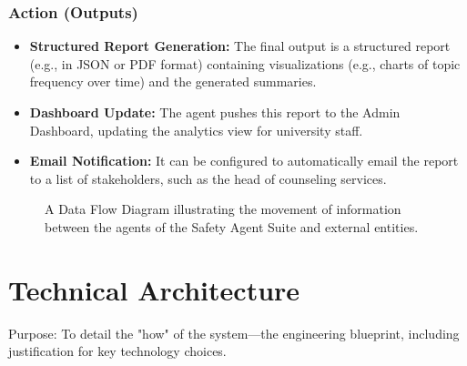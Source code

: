 \subsubsection{Action (Outputs)}
\begin{itemize}
    \item \textbf{Structured Report Generation:} The final output is a structured report (e.g., in JSON or PDF format) containing visualizations (e.g., charts of topic frequency over time) and the generated summaries.
    \item \textbf{Dashboard Update:} The agent pushes this report to the Admin Dashboard, updating the analytics view for university staff.
    \item \textbf{Email Notification:} It can be configured to automatically email the report to a list of stakeholders, such as the head of counseling services.
\end{itemize}

\begin{figure}[h]
    \centering
    \caption{A Data Flow Diagram illustrating the movement of information between the agents of the Safety Agent Suite and external entities.}
    \label{fig:dfd}
\end{figure}



\section{Technical Architecture}
Purpose: To detail the "how" of the system—the engineering blueprint, including justification for key technology choices.

